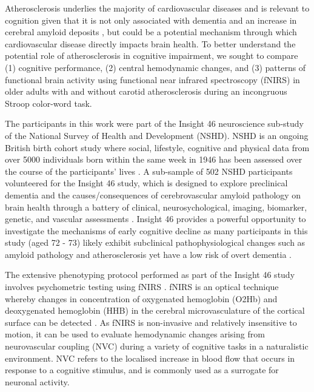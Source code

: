 \documentclass[12pt]{spieman}  %
\begin{document}
\begin{spacing}{2}
Atherosclerosis underlies the majority of cardiovascular diseases and is relevant to cognition given that it is not only associated with dementia \cite{Hofman1997} and an increase in cerebral amyloid deposits \cite{Honig2005, Li2003}, but could be a potential mechanism through which cardiovascular disease directly impacts brain health\cite{Honjo2012}. To better understand the potential  role of atherosclerosis in cognitive impairment, we sought to compare (1) cognitive performance, (2) central hemodynamic changes, and (3) patterns of functional brain activity using functional near infrared spectroscopy (fNIRS) in older adults with and without carotid atherosclerosis during an incongruous Stroop color-word task. 

The participants in this work were part of the Insight 46 neuroscience sub-study of the National Survey of Health and Development (NSHD). NSHD is an ongoing British birth cohort study where social, lifestyle, cognitive and physical data from over 5000 individuals born within the same week in 1946 has been assessed over the course of the participants' lives \cite{Kuh2011, James2018, Kuh2016}. A sub-sample of 502 NSHD participants volunteered for the Insight 46 study, which is designed to explore preclinical dementia and the causes/consequences of cerebrovascular amyloid pathology on brain health through a battery of clinical, neurosychological, imaging, biomarker, genetic, and vascular assessments \cite{Lane2017, Mason2020b}. Insight 46 provides a powerful opportunity to investigate the mechanisms of early cognitive decline as many participants in this study (aged 72 - 73) likely exhibit subclinical pathophysiological changes such as amyloid pathology and atherosclerosis yet have a low risk of overt dementia \cite{Ferri2014}. 

The extensive phenotyping protocol performed as part of the Insight 46 study involves psychometric testing using fNIRS \cite{Mason2020b}. fNIRS is an optical technique whereby changes in concentration of oxygenated hemoglobin (O2Hb) and deoxygenated hemoglobin (HHB) in the cerebral microvasculature of the cortical surface can be detected \cite{Scholkmann2014, Bunce2006}. As fNIRS is non-invasive and relatively insensitive to motion, it can be used to evaluate hemodynamic changes arising from neurovascular coupling (NVC) during a variety of cognitive tasks in a naturalistic environment\cite{Pinti2017, Udina2020}. NVC refers to the localised increase in blood flow that occurs in response to a cognitive stimulus, and is commonly used as a surrogate for neuronal activity. 


\end{spacing}
\end{document}
